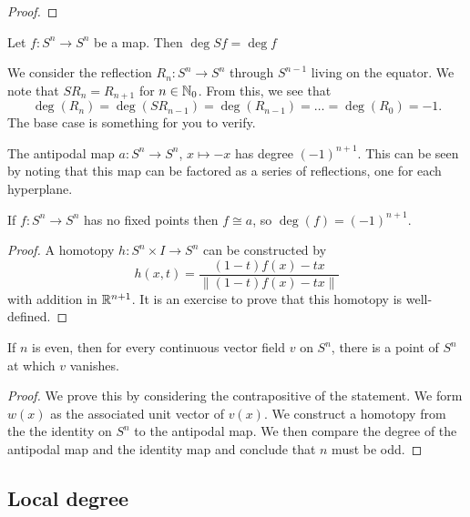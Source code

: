 \begin{proof}
\end{proof}

\begin{corollary}
  Let $f: S^n \to S^n$ be a map. Then $\deg Sf = \deg f$
\end{corollary}

\begin{example}
  We consider the reflection $R_n: S^n \to S^n$ through $S^{n-1}$ living on the equator. We note that $SR_n = R_{n+1}$ for $n \in \mathbb{N}_0$. From this, we see that
  \[ \deg(R_n) = \deg(SR_{n-1}) = \deg(R_{n-1}) = \ldots = \deg(R_0) = -1. \]
  The base case is something for you to verify.
\end{example}

\begin{example}
  The antipodal map $a: S^n \to S^n$, $x \mapsto -x$ has degree $(-1)^{n+1}$. This can be seen by noting that this map can be factored as a series of reflections, one for each hyperplane. 
\end{example}

\begin{lemma}
  If $f: S^n \to S^n$ has no fixed points then $f \cong a$, so $\deg(f) = (-1)^{n+1}$. 
\end{lemma}

\begin{proof}
  A homotopy $h: S^n \times I \to S^n$ can be constructed by
  \[
    h(x, t) = \dfrac{(1-t) f(x) - tx}{\lVert (1 - t) f(x) - tx \rVert}
  \]
  with addition in $\mathbb{R}^{n+1}$. It is an exercise to prove that this homotopy is well-defined. 
\end{proof}

\begin{theorem}
  If $n$ is even, then for every continuous vector field $v$ on $S^n$, there is a point of $S^n$ at which $v$ vanishes. 
\end{theorem}

\begin{proof}
  We prove this by considering the contrapositive of the statement. We form $w(x)$ as the associated unit vector of $v(x)$. We construct a homotopy from the the identity on $S^n$ to the antipodal map. We then compare the degree of the antipodal map and the identity map and conclude that $n$ must be odd. 
\end{proof}

\subsection{Local degree}

